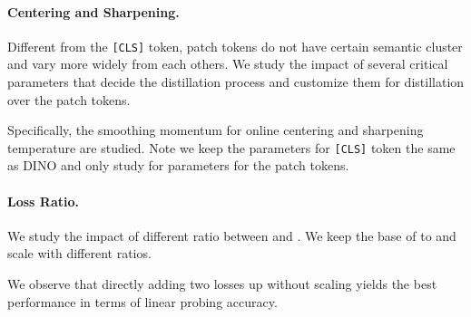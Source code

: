 \documentclass{article} \usepackage{iclr2022_conference,times}
\begin{document}
\paragraph{Centering and Sharpening.} Different from the \texttt{[CLS]} token, patch tokens do not have certain semantic cluster and vary more widely from each others. We study the impact of several critical parameters that decide the distillation process and customize them for distillation over the patch tokens.
\vspace{-0.3cm}
\begin{table}[H]
\centering
{}
\end{table}
\vspace{-0.7cm}
Specifically, the smoothing momentum for online centering  and sharpening temperature  are studied. Note we keep the parameters for \texttt{[CLS]} token the same as DINO and only study for parameters for the patch tokens. 

\paragraph{Loss Ratio.} We study the impact of different ratio between  and . We keep the base of  to  and scale  with different ratios.
\vspace{-0.3cm}
\begin{table}[H]
\centering
{}
\end{table}
\vspace{-0.7cm}
We observe that directly adding two losses up without scaling yields the best performance in terms of linear probing accuracy. 
\end{document}
